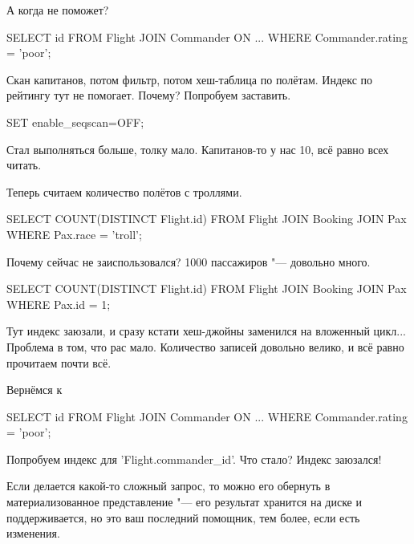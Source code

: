 А когда не поможет?
\begin{sqlcode}
SELECT
	id
	FROM Flight
	JOIN Commander ON ...
	WHERE Commander.rating = 'poor';
\end{sqlcode}
Скан капитанов, потом фильтр, потом хеш-таблица по полётам.
Индекс по рейтингу тут не помогает. Почему? Попробуем заставить.
\begin{sqlcode}
SET enable_seqscan=OFF;
\end{sqlcode}
Стал выполняться больше, толку мало.
Капитанов-то у нас 10, всё равно всех читать.

Теперь считаем количество полётов с троллями.
\begin{sqlcode}
SELECT
	COUNT(DISTINCT Flight.id)
	FROM Flight
	JOIN Booking
	JOIN Pax
	WHERE Pax.race = 'troll';
\end{sqlcode}
Почему сейчас не заиспользовался? 1000 пассажиров "--- довольно много.
\begin{sqlcode}
SELECT
	COUNT(DISTINCT Flight.id)
	FROM Flight
	JOIN Booking
	JOIN Pax
	WHERE Pax.id = 1;
\end{sqlcode}
Тут индекс заюзали, и сразу кстати хеш-джойны заменился на вложенный цикл...
Проблема в том, что рас мало. Количество записей довольно велико, и всё равно прочитаем почти всё.

Вернёмся к
\begin{sqlcode}
SELECT
	id
	FROM Flight
	JOIN Commander ON ...
	WHERE Commander.rating = 'poor';
\end{sqlcode}
Попробуем индекс для \sql'Flight.commander_id'.
Что стало? Индекс заюзался!

Если делается какой-то сложный запрос, то можно его обернуть в материализованное представление "--- его результат хранится на диске и поддерживается, но это ваш последний помощник, тем более, если есть изменения.
